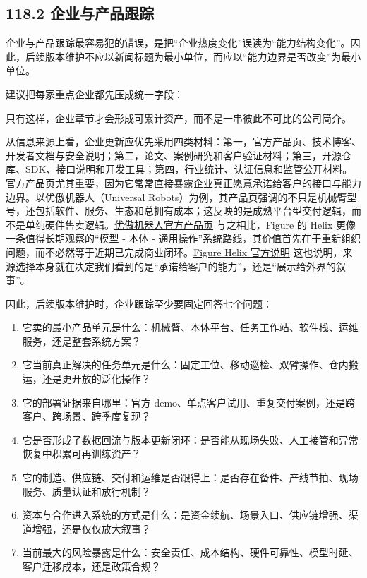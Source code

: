 \subsection*{118.2 企业与产品跟踪}


企业与产品跟踪最容易犯的错误，是把“企业热度变化”误读为“能力结构变化”。因此，后续版本维护不应以新闻标题为最小单位，而应以“能力边界是否改变”为最小单位。

建议把每家重点企业都先压成统一字段：

\texttt{}

只有这样，企业章节才会形成可累计资产，而不是一串彼此不可比的公司简介。

从信息来源上看，企业更新应优先采用四类材料：第一，官方产品页、技术博客、开发者文档与安全说明；第二，论文、案例研究和客户验证材料；第三，开源仓库、SDK、接口说明和开发工具；第四，行业统计、认证信息和监管公开材料。官方产品页尤其重要，因为它常常直接暴露企业真正愿意承诺给客户的接口与能力边界。以优傲机器人（Universal Robots）为例，其产品页强调的不只是机械臂型号，还包括软件、服务、生态和总拥有成本；这反映的是成熟平台型交付逻辑，而不是单纯硬件售卖逻辑。\href{https://www.universal-robots.com/products/}{优傲机器人官方产品页} 与之相比，Figure 的 Helix 更像一条值得长期观察的“模型 - 本体 - 通用操作”系统路线，其价值首先在于重新组织问题，而不必然等于近期已完成商业闭环。\href{https://www.figure.ai/news/helix}{Figure Helix 官方说明} 这也说明，来源选择本身就在决定我们看到的是“承诺给客户的能力”，还是“展示给外界的叙事”。

因此，后续版本维护时，企业跟踪至少要固定回答七个问题：

\begin{enumerate}
\item 它卖的最小产品单元是什么：机械臂、本体平台、任务工作站、软件栈、运维服务，还是整套系统方案？
\item 它当前真正解决的任务单元是什么：固定工位、移动巡检、双臂操作、仓内搬运，还是更开放的泛化操作？
\item 它的部署证据来自哪里：官方 demo、单点客户试用、重复交付案例，还是跨客户、跨场景、跨季度复现？
\item 它是否形成了数据回流与版本更新闭环：是否能从现场失败、人工接管和异常恢复中积累可再训练资产？
\item 它的制造、供应链、交付和运维是否跟得上：是否存在备件、产线节拍、现场服务、质量认证和放行机制？
\item 资本与合作进入系统的方式是什么：是资金续航、场景入口、供应链增强、渠道增强，还是仅仅放大叙事？
\item 当前最大的风险暴露是什么：安全责任、成本结构、硬件可靠性、模型时延、客户迁移成本，还是政策合规？
\end{enumerate}


